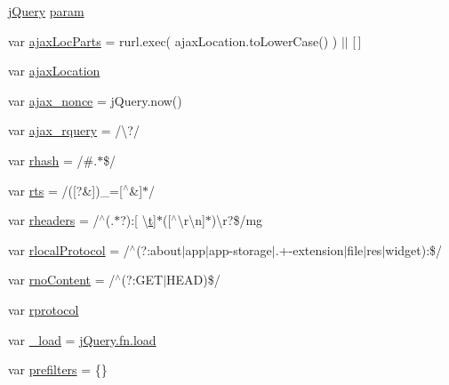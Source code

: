 \begin{DoxyCompactItemize}
\item 
\hyperlink{_scripts_2jquery-1_810_82_8js_a5e01048fbd3a30b44e8d491d8945c457}{j\+Query} \hyperlink{_scripts_2jquery-1_810_82_8js_a24ced9cd3c9e1970a8cbe8d7adedc765}{param}
\item 
var \hyperlink{_scripts_2jquery-1_810_82_8js_a4c35110da3c335cfca38505ee65a5e79}{ajax\+Loc\+Parts} = rurl.\+exec( ajax\+Location.\+to\+Lower\+Case() ) $\vert$$\vert$ \mbox{[}$\,$\mbox{]}
\item 
var \hyperlink{_scripts_2jquery-1_810_82_8js_a1661d4e1676e7c6ffde5a3cb8d8ae246}{ajax\+Location}
\item 
var \hyperlink{_scripts_2jquery-1_810_82_8js_aaa43e6d4c76ee8be878dd7e93fb755a4}{ajax\+\_\+nonce} = j\+Query.\+now()
\item 
var \hyperlink{_scripts_2jquery-1_810_82_8js_a4da85c0011217bf1643139dc23999c5c}{ajax\+\_\+rquery} = /\textbackslash{}?/
\item 
var \hyperlink{_scripts_2jquery-1_810_82_8js_a6990b6955b6bec9dd39f3814cfb56d6d}{rhash} = /\#.$\ast$\$/
\item 
var \hyperlink{_scripts_2jquery-1_810_82_8js_a38ff30904f54277281a13514d7aea00d}{rts} = /(\mbox{[}?\&\mbox{]})\+\_\+=\mbox{[}$^\wedge$\&\mbox{]}$\ast$/
\item 
var \hyperlink{_scripts_2jquery-1_810_82_8js_af506d11612139f03091db71089d92e8b}{rheaders} = /$^\wedge$(.$\ast$?)\+:\mbox{[} \textbackslash{}\hyperlink{_scripts_2jquery_8validate_8min_8js_a23c5666e83bbbceee94adcd0851f50c4}{t}\mbox{]}$\ast$(\mbox{[}$^\wedge$\textbackslash{}r\textbackslash{}n\mbox{]}$\ast$)\textbackslash{}r?\$/mg
\item 
var \hyperlink{_scripts_2jquery-1_810_82_8js_af4dd13c90298bbf53ce08ec707dc9e2a}{rlocal\+Protocol} = /$^\wedge$(?\+:about$\vert$app$\vert$app-\/storage$\vert$.+-\/extension$\vert$file$\vert$res$\vert$widget)\+:\$/
\item 
var \hyperlink{_scripts_2jquery-1_810_82_8js_a537d744d72e31ec312aa3f16ef576d3f}{rno\+Content} = /$^\wedge$(?\+:G\+E\+T$\vert$H\+E\+A\+D)\$/
\item 
var \hyperlink{_scripts_2jquery-1_810_82_8js_a0f02b710647fcf95e74593954fb9b4cb}{rprotocol}
\item 
var \hyperlink{_scripts_2jquery-1_810_82_8js_ab9d9919a16b6ef96017991e55a3a9e6c}{\+\_\+load} = \hyperlink{_scripts_2jquery-1_810_82_8js_a8d0b9ec82c308161432f1c387d2fc2a7}{j\+Query.\+fn.\+load}
\item 
var \hyperlink{_scripts_2jquery-1_810_82_8js_a5682e57225039bc5b0c2e80654930080}{prefilters} = \{\}
$$
\end{DoxyCompactItemize}

